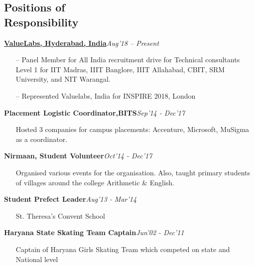 \documentclass[margin,line]{templates/resume}
\newcommand{\compresslist}{%
\setlength{\itemsep}{3pt}%
\setlength{\parskip}{0pt}%
\setlength{\parsep}{0pt}%
}
\begin{document}
\begin{resume}



\vspace{-0.2cm}    
\section{\mysidestyle Positions of \\ Responsibility}
  \textbf{\href{https://www.valuelabs.com/}{ValueLabs, Hyderabad, India}}\hfill{\textit{Aug'18 -- Present}}
\begin{itemize}[leftmargin=*]\compresslist
\item[--]Panel Member for All India recruitment drive for Technical consultants Level 1 for IIT Madras, IIIT Banglore, IIIT Allahabad, CBIT, SRM University, and NIT Warangal.
\item[--]Represented Valuelabs, India for INSPIRE 2018, London
\end{itemize}
\vspace{-0.2cm}
  \textbf{Placement Logistic Coordinator,BITS}\hfill{\textit{Sep'14 - Dec'17}}
\begin{itemize}[leftmargin=*]\compresslist
\item[]Hosted 3 companies for campus placements: Accenture, Microsoft, MuSigma as a coordinator.
\end{itemize}
\vspace{-0.2cm}
  \textbf{Nirmaan, Student Volunteer}\hfill{\textit{Oct'14 - Dec'17}}
\begin{itemize}[leftmargin=*]\compresslist
\item[]Organised various events for the organisation. Also, taught primary students of villages around the college Arithmetic \&  English.
\end{itemize}
\vspace{-0.2cm}
  \textbf{Student Prefect Leader}\hfill{\textit{Aug'13 - Mar'14}}
 \begin{itemize}[leftmargin=*]\compresslist
\item[]St. Theresa's Convent School
\end{itemize}
\vspace{-0.2cm}
  \textbf{Haryana State Skating Team Captain}\hfill{\textit{Jun'02 - Dec'11}}
 \begin{itemize}[leftmargin=*]\compresslist
\item[]Captain of Haryana Girls Skating Team which competed on state and National level
\end{itemize}


\end{resume}
\end{document}
